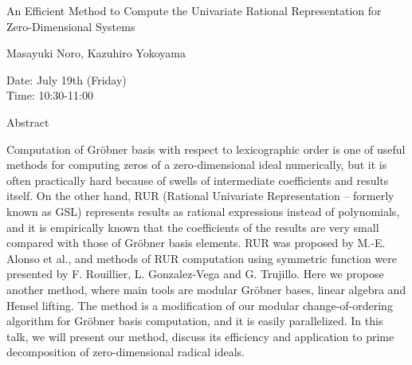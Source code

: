 \begin{center}
\LARGE
An Efficient Method to Compute the Univariate Rational
        Representation for Zero-Dimensional Systems

\end{center}

\begin{center}
\Large
Masayuki Noro, Kazuhiro Yokoyama 

\end{center}

\noindent
Date:  July 19th (Friday)\\
Time:  10:30-11:00\\

\begin{center}
\large
Abstract
\end{center}

Computation of Gr\"obner basis with respect to lexicographic order is one of useful methods for
computing zeros of a zero-dimensional ideal numerically, but it is often practically hard because
of swells of intermediate coefficients and results itself. On the other hand, RUR (Rational
Univariate Representation -- formerly known as GSL) represents results as rational expressions
instead of polynomials, and it is empirically known that the coefficients of the results are very
small compared with those of Gr\"obner basis elements. RUR was proposed by M.-E. Alonso et al.,
and methods of RUR computation using symmetric function were presented by F. Rouillier, L.
Gonzalez-Vega and G. Trujillo. Here we propose another method, where main tools are modular
Gr\"obner bases, linear algebra and Hensel lifting. The method is a modification of our modular
change-of-ordering algorithm for Gr\"obner basis computation, and it is easily parallelized. In this
talk, we will present our method, discuss its efficiency and application to prime decomposition of
zero-dimensional radical ideals. 

